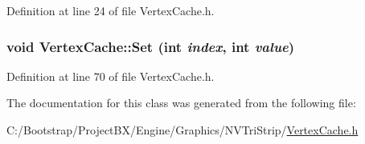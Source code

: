 Definition at line 24 of file VertexCache.h.\hypertarget{class_vertex_cache_3edb54161593c38eebc7e8e284d95008}{
\subsubsection[{Set}]{\setlength{\rightskip}{0pt plus 5cm}void VertexCache::Set (int {\em index}, \/  int {\em value})}}
\label{class_vertex_cache_3edb54161593c38eebc7e8e284d95008}




Definition at line 70 of file VertexCache.h.

The documentation for this class was generated from the following file:\begin{CompactItemize}
\item 
C:/Bootstrap/ProjectBX/Engine/Graphics/NVTriStrip/\hyperlink{_vertex_cache_8h}{VertexCache.h}\end{CompactItemize}
